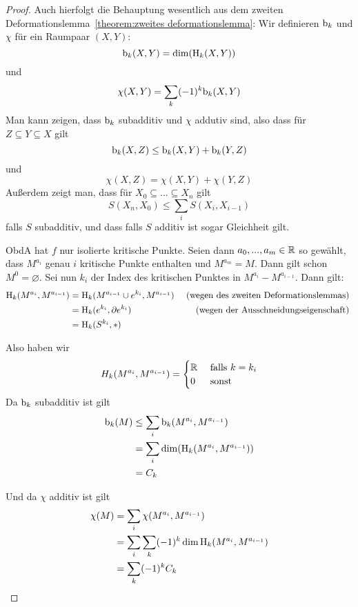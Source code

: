 \begin{proof}
    Auch hierfolgt die Behauptung wesentlich aus dem zweiten 
    Deformationslemma~\ref{theorem:zweites deformationslemma}:
    Wir definieren ${ \operatorname{b} }_k$ und $\chi$ für ein Raumpaar $(X, Y)$:
    \[ { \operatorname{b} }_k(X, Y) = \dim ({ \operatorname{H} }_k (X, Y)) \]
    und 
    \[ \chi(X, Y) = \sum_k (-1)^k { \operatorname{b} }_k(X, Y) \]
    Man kann zeigen, dass ${ \operatorname{b} }_k$ subadditiv und $\chi$ addutiv sind, also
    dass für $Z \subseteq Y \subseteq X$ gilt
    \[ { \operatorname{b} }_k(X, Z) \leq { \operatorname{b} }_k(X, Y) + { \operatorname{b} }_k(Y, Z) \]
    und 
    \[ \chi(X, Z) = \chi(X, Y) + \chi(Y, Z) \]
    Außerdem zeigt man, dass für $X_0 \subseteq ... \subseteq X_n$ gilt
    \[ S(X_n, X_0) \leq \sum_i S(X_i, X_{i-1}) \]
    falls $S$ subadditiv, und dass falls $S$ additiv ist sogar Gleichheit gilt.
    
    ObdA hat $f$ nur isolierte kritische Punkte. Seien dann 
    $a_0, ..., a_m \in { \mathbb R }$ so gewählt, dass $M^{a_i}$ genau $i$ kritische Punkte
    enthalten und $M^{a_m} = M$. Dann gilt schon $M^0 = \varnothing$. Sei nun $k_i$
    der Index des kritischen Punktes in $M^{a_i} - M^{a_{i-1}}$. Dann gilt:
    \begin{align*}
        { \operatorname{H} }_k(M^{a_i}, M^{a_{i-1}}) 
            & = { \operatorname{H} }_k(M^{a_{i-1}} \cup e^{k_i}, M^{a_{i-1}})
            & \text{ (wegen des zweiten Deformationslemmas) } \\
        & = { \operatorname{H} }_k(e^{k_i}, { \partial } e^{k_i})
            & \text{ (wegen der Ausschneidungseigenschaft) } \\
        & = { \operatorname{H} }_k(S^{k_i}, \ast)
    \end{align*}

    Also haben wir
    \[ 
        H_k(M^{a_i}, M^{a_{i-1}}) = \begin{cases}
            { \mathbb R } &\text{ falls } k = k_i \\
            0 & \text{ sonst }
        \end{cases}
    \]
    Da ${ \operatorname{b} }_k$ subadditiv ist gilt 
    \begin{align*}
        { \operatorname{b} }_k(M) 
           & \leq \sum_i { \operatorname{b} }_k(M^{a_i}, M^{a_{i-1}}) \\
           & = \sum_i \dim({ \operatorname{H} }_k(M^{a_i}, M^{a_{i-1}})) \\
           & = C_k
    \end{align*}
    
    Und da $\chi$ additiv ist gilt
    \begin{align*}
        \chi(M) 
           & = \sum_i \chi (M^{a_i}, M^{a_{i-1}}) \\
           & = \sum_i \sum_k (-1)^k \dim { \operatorname{H} }_k (M^{a_i}, M^{a_{i-1}}) \\
           & = \sum_k (-1)^k C_k
    \end{align*}


\end{proof}
